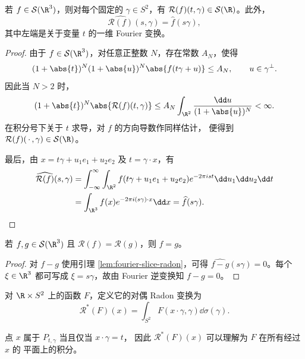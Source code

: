 \begin{lemma}\label{lem:fourier-slice-radon}
	若 $f\in\mathcal S(\R^3)$，则对每个固定的
	$\gamma\in S^2$，有 $\mathcal R(f)(t,\gamma)\in
	\mathcal S(\R)$。此外，
	\[
	\widehat{\mathcal R(f)}(s,\gamma)
	=\widehat f(s\gamma),
	\]
	其中左端是关于变量 $t$ 的一维 Fourier 变换。
\end{lemma}

\begin{proof}
	由于 $f\in\mathcal S(\R^3)$，对任意正整数 $N$，存在常数
	$A_N$，使得
	\[
	(1+\abs{t})^N(1+\abs{u})^N
	\abs{f(t\gamma+u)}\leq A_N,
	\qquad u\in\gamma^\perp.
	\]
	因此当 $N>2$ 时，
	\[
	(1+\abs{t})^N\abs{\mathcal R(f)(t,\gamma)}
	\leq A_N\int_{\R^2}\frac{\dd u}{(1+\abs{u})^N}<\infty.
	\]
	在积分号下关于 $t$ 求导，对 $f$ 的方向导数作同样估计，
	便得到 $\mathcal R(f)(\,\cdot\,,\gamma)\in\mathcal S(\R)$。

	最后，由 $x=t\gamma+u_1e_1+u_2e_2$ 及
	$t=\gamma\cdot x$，有
	\[
	\begin{aligned}
	\widehat{\mathcal R(f)}(s,\gamma)
	&=\int_{-\infty}^{\infty}
	\int_{\R^2}f(t\gamma+u_1e_1+u_2e_2)
	e^{-2\pi ist}\dd u_1\dd u_2\dd t\\
	&=\int_{\R^3}f(x)e^{-2\pi i(s\gamma)\cdot x}\dd x
	=\widehat f(s\gamma).
	\end{aligned}
	\]
\end{proof}

\begin{corollary}\label{cor:radon-injective}
	若 $f,g\in\mathcal S(\R^3)$ 且
	$\mathcal R(f)=\mathcal R(g)$，则 $f=g$。
\end{corollary}

\begin{proof}
	对 $f-g$ 使用引理 \ref{lem:fourier-slice-radon}，可得
	$\widehat{f-g}(s\gamma)=0$。每个 $\xi\in\R^3$ 都可写成
	$\xi=s\gamma$，故由 Fourier 逆变换知 $f-g=0$。
\end{proof}

\begin{definition}\label{def:dual-radon-transform}
	对 $\R\times S^2$ 上的函数 $F$，定义它的对偶 Radon 变换为
	\[
	\mathcal R^*(F)(x)
	=\int_{S^2}F(x\cdot\gamma,\gamma)\dd\sigma(\gamma).
	\]
\end{definition}
点 $x$ 属于 $P_{t,\gamma}$ 当且仅当 $x\cdot\gamma=t$，
因此 $\mathcal R^*(F)(x)$ 可以理解为 $F$ 在所有经过 $x$ 的
平面上的积分。


